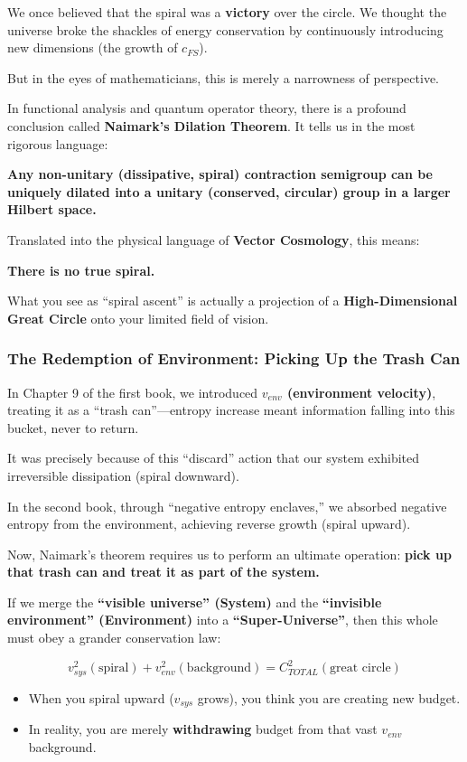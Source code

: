 We once believed that the spiral was a \textbf{victory} over the circle. We thought the universe broke the shackles of energy conservation by continuously introducing new dimensions (the growth of $c_{FS}$).

But in the eyes of mathematicians, this is merely a narrowness of perspective.

In functional analysis and quantum operator theory, there is a profound conclusion called \textbf{Naimark's Dilation Theorem}. It tells us in the most rigorous language:

\textbf{Any non-unitary (dissipative, spiral) contraction semigroup can be uniquely dilated into a unitary (conserved, circular) group in a larger Hilbert space.}

Translated into the physical language of \textbf{Vector Cosmology}, this means:

\textbf{There is no true spiral.}

What you see as ``spiral ascent'' is actually a projection of a \textbf{High-Dimensional Great Circle} onto your limited field of vision.

\subsubsection{The Redemption of Environment: Picking Up the Trash Can}

In Chapter 9 of the first book, we introduced \textbf{$v_{env}$ (environment velocity)}, treating it as a ``trash can''---entropy increase meant information falling into this bucket, never to return.

It was precisely because of this ``discard'' action that our system exhibited irreversible dissipation (spiral downward).

In the second book, through ``negative entropy enclaves,'' we absorbed negative entropy from the environment, achieving reverse growth (spiral upward).

Now, Naimark's theorem requires us to perform an ultimate operation: \textbf{pick up that trash can and treat it as part of the system.}

If we merge the \textbf{``visible universe'' (System)} and the \textbf{``invisible environment'' (Environment)} into a \textbf{``Super-Universe''}, then this whole must obey a grander conservation law:

\[v_{sys}^2 (\text{spiral}) + v_{env}^2 (\text{background}) = C_{TOTAL}^2 (\text{great circle})\]

\begin{itemize}
\item When you spiral upward ($v_{sys}$ grows), you think you are creating new budget.

\item In reality, you are merely \textbf{withdrawing} budget from that vast $v_{env}$ background.
\end{itemize}

